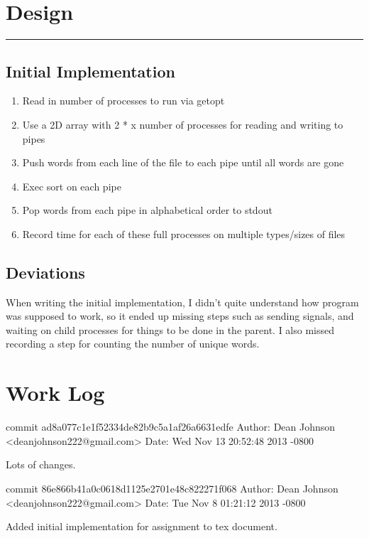 \documentclass[fleqn,10pt,titlepage]{article}
\begin{document}
\section{Design}
\hrule
\subsection{Initial Implementation}
\begin{enumerate}
\item Read in number of processes to run via getopt \\
\item Use a 2D array with 2 * x number of processes for reading and writing to pipes \\
\item Push words from each line of the file to each pipe until all words are gone \\
\item Exec sort on each pipe \\
\item Pop words from each pipe in alphabetical order to stdout \\
\item Record time for each of these full processes on multiple types/sizes of files \\
\end{enumerate}
\subsection{Deviations}
When writing the initial implementation, I didn't quite understand how program was supposed to work,
so it ended up missing steps such as sending signals, and waiting on child processes for things to be
done in the parent. I also missed recording a step for counting the number of unique words. 
\clearpage

\section{Work Log}
commit ad8a077c1e1f52334de82b9c5a1af26a6631edfe
Author: Dean Johnson <deanjohnson222@gmail.com>
Date:   Wed Nov 13 20:52:48 2013 -0800

    Lots of changes.

commit 86e866b41a0c0618d1125e2701e48c822271f068
Author: Dean Johnson <deanjohnson222@gmail.com>
Date:   Tue Nov 8 01:21:12 2013 -0800

    Added initial implementation for assignment to tex document.
\end{document}
